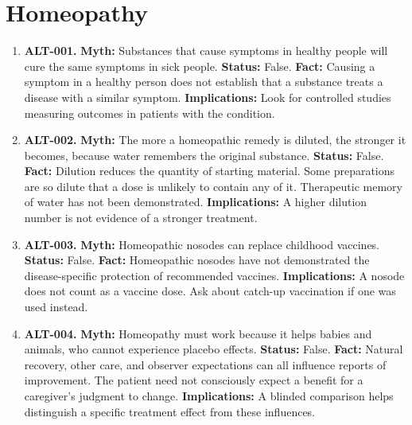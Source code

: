 \documentclass[11pt,oneside]{book}
\begin{document}
\section{Homeopathy}
\begin{enumerate}[leftmargin=0pt,labelwidth=0pt,labelsep=0pt,itemindent=0pt]
\item[] \textbf{ALT-001.} \textbf{Myth:} Substances that cause symptoms in healthy people will cure the same symptoms in sick people.\newline
\textbf{Status:} False.\newline
\textbf{Fact:} Causing a symptom in a healthy person does not establish that a substance treats a disease with a similar symptom. \cite{ref469}\newline
\textbf{Implications:} Look for controlled studies measuring outcomes in patients with the condition.
\item[] \textbf{ALT-002.} \textbf{Myth:} The more a homeopathic remedy is diluted, the stronger it becomes, because water remembers the original substance.\newline
\textbf{Status:} False.\newline
\textbf{Fact:} Dilution reduces the quantity of starting material. Some preparations are so dilute that a dose is unlikely to contain any of it. Therapeutic memory of water has not been demonstrated. \cite{ref469}\newline
\textbf{Implications:} A higher dilution number is not evidence of a stronger treatment.
\item[] \textbf{ALT-003.} \textbf{Myth:} Homeopathic nosodes can replace childhood vaccines.\newline
\textbf{Status:} False.\newline
\textbf{Fact:} Homeopathic nosodes have not demonstrated the disease-specific protection of recommended vaccines. \cite{ref469,ref314}\newline
\textbf{Implications:} A nosode does not count as a vaccine dose. Ask about catch-up vaccination if one was used instead.
\item[] \textbf{ALT-004.} \textbf{Myth:} Homeopathy must work because it helps babies and animals, who cannot experience placebo effects.\newline
\textbf{Status:} False.\newline
\textbf{Fact:} Natural recovery, other care, and observer expectations can all influence reports of improvement. The patient need not consciously expect a benefit for a caregiver's judgment to change. \cite{ref469}\newline
\textbf{Implications:} A blinded comparison helps distinguish a specific treatment effect from these influences.
\end{enumerate}
\end{document}
